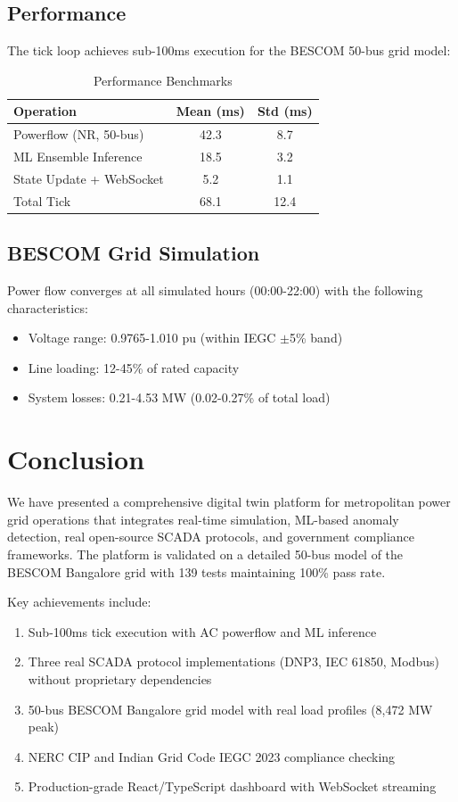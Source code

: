 \documentclass[conference]{IEEEtran}
\begin{document}
\subsection{Performance}

The tick loop achieves sub-100ms execution for the BESCOM 50-bus grid model:

\begin{table}[h]
\centering
\caption{Performance Benchmarks}
\label{tab:perf}
\begin{tabular}{@{}lcc@{}}
\toprule
\textbf{Operation} & \textbf{Mean (ms)} & \textbf{Std (ms)} \\
\midrule
Powerflow (NR, 50-bus) & 42.3 & 8.7 \\
ML Ensemble Inference & 18.5 & 3.2 \\
State Update + WebSocket & 5.2 & 1.1 \\
Total Tick & 68.1 & 12.4 \\
\bottomrule
\end{tabular}
\end{table}

\subsection{BESCOM Grid Simulation}

Power flow converges at all simulated hours (00:00-22:00) with the following characteristics:

\begin{itemize}
\item Voltage range: 0.9765-1.010 pu (within IEGC $\pm$5\% band)
\item Line loading: 12-45\% of rated capacity
\item System losses: 0.21-4.53 MW (0.02-0.27\% of total load)
\end{itemize}

\section{Conclusion}

We have presented a comprehensive digital twin platform for metropolitan power grid operations that integrates real-time simulation, ML-based anomaly detection, real open-source SCADA protocols, and government compliance frameworks. The platform is validated on a detailed 50-bus model of the BESCOM Bangalore grid with 139 tests maintaining 100\% pass rate.

Key achievements include:
\begin{enumerate}
\item Sub-100ms tick execution with AC powerflow and ML inference
\item Three real SCADA protocol implementations (DNP3, IEC 61850, Modbus) without proprietary dependencies
\item 50-bus BESCOM Bangalore grid model with real load profiles (8,472 MW peak)
\item NERC CIP and Indian Grid Code IEGC 2023 compliance checking
\item Production-grade React/TypeScript dashboard with WebSocket streaming
\end{enumerate}
\end{document}
